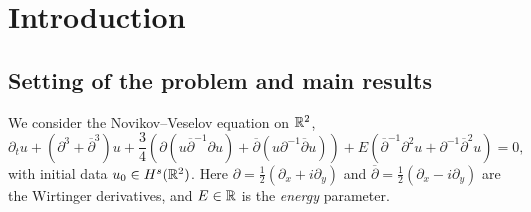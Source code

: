 %

\section{Introduction}

\subsection{Setting of the problem and main results}

We consider the Novikov--Veselov equation on $\mathbb{R}^2$,
\begin{equation}\tag{NV}\label{eq:NV}
		\partial_t u + (\partial^3 + \overline{\partial}^3)u + \frac34(\partial(u\overline{\partial}^{-1}\partial u) + \overline{\partial}(u\partial^{-1}\overline{\partial}u)) + E(\overline{\partial}^{-1}\partial^2 u + \partial^{-1}\overline{\partial}^2 u)=0,
\end{equation}
with initial data $u_0\in H^s(\mathbb{R}^2)$. Here $\partial=\tfrac12(\partial_x+i\partial_y)$ and $\overline{\partial}=\tfrac12(\partial_x-i\partial_y)$ are the Wirtinger derivatives, and $E\in\mathbb{R}$ is the \emph{energy} parameter.

